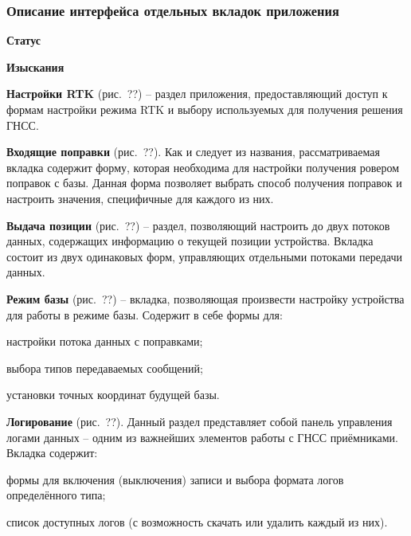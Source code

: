 \subsubsection{Описание интерфейса отдельных вкладок приложения}
\label{subsec:app-sketch-tabs}

\begin{dashitemize}
  \item \textbf{Статус}

  \item \textbf{Изыскания}

  \item \textbf{Настройки RTK} (рис.~??) -- раздел приложения, предоставляющий доступ к формам настройки режима RTK и выбору используемых для получения решения ГНСС.

  \item \textbf{Входящие поправки} (рис.~??). Как и следует из названия, рассматриваемая вкладка содержит форму, которая необходима для настройки получения ровером поправок с базы. Данная форма позволяет выбрать способ получения поправок и настроить значения, специфичные для каждого из них.

  \item \textbf{Выдача позиции} (рис.~??) -- раздел, позволяющий настроить до двух потоков данных, содержащих информацию о текущей позиции устройства. Вкладка состоит из двух одинаковых форм, управляющих отдельными потоками передачи данных.

  \item \textbf{Режим базы} (рис.~??) -- вкладка, позволяющая произвести настройку устройства для работы в режиме базы. Содержит в себе формы для:
  \begin{dashitemize}
    \item настройки потока данных с поправками;
    \item выбора типов передаваемых сообщений;
    \item установки точных координат будущей базы.
  \end{dashitemize}

  \item \textbf{Логирование} (рис.~??). Данный раздел представляет собой панель управления логами данных -- одним из важнейших элементов работы с ГНСС приёмниками. Вкладка содержит:
  \begin{dashitemize}
    \item формы для включения (выключения) записи и выбора формата логов определённого типа;
    \item список доступных логов (с возможность скачать или удалить каждый из них).
  \end{dashitemize}


\end{dashitemize}
